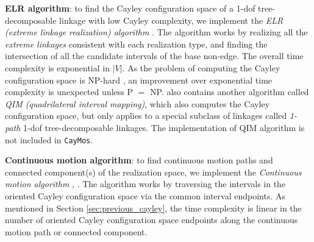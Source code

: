 \documentclass[prodmode,acmtoms]{acmsmall}
\begin{document}
\textbf{ELR algorithm}: 
to find the Cayley configuration space of a 1-dof tree-decomposable linkage with low Cayley complexity, 
we implement the \emph{ELR (extreme linkage realization) algorithm} \cite[Section B]{Sitharam2011a}.
The algorithm works by realizing all the \emph{extreme linkages} consistent with each realization type, 
and finding the intersection of all the candidate intervals of the base non-edge. 
The overall time complexity is exponential in $|V|$.
As the problem of computing the Cayley configuration space is NP-hard \citep[Observation 2]{Sitharam2011a},
an improvement over exponential time complexity is unexpected unless P $=$ NP. 
 also contains another algorithm called \emph{QIM (quadrilateral interval mapping)}, which also computes the Cayley configuration space, 
but only applies to a special subclass of linkages called \emph{1-path} 1-dof tree-decomposable linkages. 
The implementation of QIM algorithm is not included in \texttt{CayMos}. 


\textbf{Continuous motion algorithm}: 
to find continuous motion paths and connected component(s) of the realization space, we implement the \emph{Continuous motion  algorithm} \cite[Theorem 3]{Sitharam2011a}, \cite[Theorem 5(i)]{sitharam2014beast}.
The algorithm works by traversing the intervals in the oriented Cayley configuration space via the common interval endpoints. 
As mentioned in Section \ref{sec:previous_cayley},
the time complexity is linear in the number of oriented Cayley configuration space endpoints along the continuous motion path or connected component. 
\end{document}
